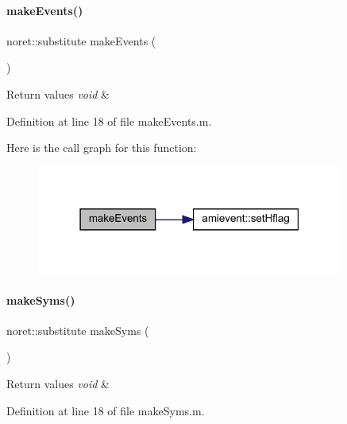 \paragraph{\texorpdfstring{make\+Events()}{makeEvents()}}
{\footnotesize\ttfamily noret\+::substitute make\+Events (\begin{DoxyParamCaption}{ }\end{DoxyParamCaption})}


\begin{DoxyRetVals}{Return values}
{\em void} & \\
\hline
\end{DoxyRetVals}


Definition at line 18 of file make\+Events.\+m.

Here is the call graph for this function\+:
\nopagebreak
\begin{figure}[H]
\begin{center}
\leavevmode
\includegraphics[width=286pt]{classamimodel_a4d4b20c81af6d7ed977b6b818c7b22db_cgraph}
\end{center}
\end{figure}
\mbox{\label{classamimodel_a5aba9155145df4b3f70bfec887c25af9}} 
\paragraph{\texorpdfstring{make\+Syms()}{makeSyms()}}
{\footnotesize\ttfamily noret\+::substitute make\+Syms (\begin{DoxyParamCaption}{ }\end{DoxyParamCaption})}


\begin{DoxyRetVals}{Return values}
{\em void} & \\
\hline
\end{DoxyRetVals}


Definition at line 18 of file make\+Syms.\+m.

\mbox{\label{classamimodel_ab566026e57f6cbce21a2a2c72b9f7f2b}} 
